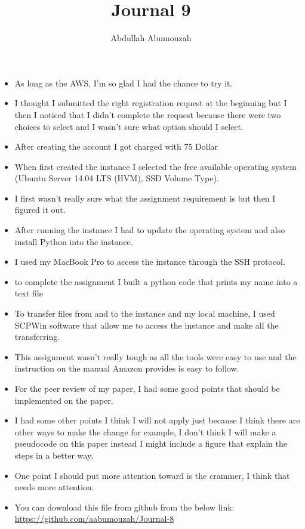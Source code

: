 \documentclass{article}
\title{Journal 9}
\author{Abdullah Abumouzah }
\begin{document}
\maketitle


\begin{itemize}
    \item As long as the AWS, I'm so glad I had the chance to try it.  
    \item I thought I submitted the right registration request at the beginning but I then I noticed that I didn't complete the request because there were two choices to select and I wasn't sure what option should I select.
    
    \item After creating the account I got charged with $75$ Dollar
    \item When first created the instance I selected the free available operating system (Ubuntu Server 14.04 LTS (HVM), SSD Volume Type). 
    
    \item I first wasn't really sure what the assignment requirement is but then I figured it out.
    
    \item After running the instance I had to update the operating system and also install Python into the instance.
    
    \item I used my MacBook Pro to access the instance through the SSH protocol. 
    
    \item to complete the assignment I built a python code that prints my name into a text file
    \item To transfer files from and to the instance and my local machine, I used SCPWin software that allow me to access the instance and make all the transferring. 
    \item This assignment wasn't really tough as all the tools were easy to use and the instruction on the manual Amazon provides is easy to follow.  
    \item For the peer review of my paper, I had some good points that should be implemented on the paper. 
    \item I had some other points I think I will not apply just because I think there are other ways to make the change for example, I don't think I will make a pseudocode on this paper instead I might include a figure that explain the steps in a better way. 
    \item One point I should put more attention toward is the crammer, I think that needs more attention. 

    
    \item You can download this file from github from the below link: \url{https://github.com/aabumouzah/Journal-8}
\end{itemize}
\end{document}
